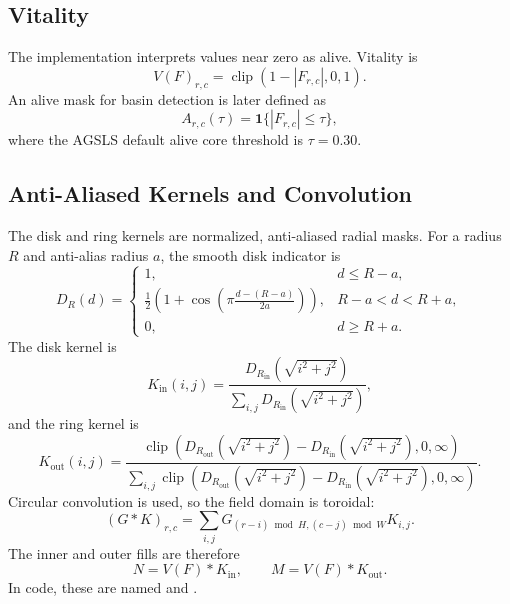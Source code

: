 \documentclass[11pt]{article}
\newcommand{\code}[1]{\texttt{\detokenize{#1}}}
\newcommand{\clip}{\operatorname{clip}}
\begin{document}
\subsection{Vitality}

The implementation interprets values near zero as alive. Vitality is
\begin{equation}
V(F)_{r,c} = \clip(1 - |F_{r,c}|, 0, 1).
\label{eq:vitality}
\end{equation}
An alive mask for basin detection is later defined as
\begin{equation}
A_{r,c}(\tau) = \mathbf{1}\{|F_{r,c}| \le \tau\},
\label{eq:alive-mask}
\end{equation}
where the AGSLS default alive core threshold is $\tau=0.30$.

\subsection{Anti-Aliased Kernels and Convolution}

The disk and ring kernels are normalized, anti-aliased radial masks. For a
radius $R$ and anti-alias radius $a$, the smooth disk indicator is
\begin{equation}
D_R(d) =
\begin{cases}
1, & d \le R-a,\\
\frac{1}{2}\left(1+\cos\left(\pi\frac{d-(R-a)}{2a}\right)\right),
& R-a < d < R+a,\\
0, & d \ge R+a.
\end{cases}
\label{eq:smooth-disk}
\end{equation}
The disk kernel is
\begin{equation}
K_{\mathrm{in}}(i,j)
= \frac{D_{R_{\mathrm{in}}}(\sqrt{i^2+j^2})}
{\sum_{i,j} D_{R_{\mathrm{in}}}(\sqrt{i^2+j^2})},
\label{eq:disk-kernel}
\end{equation}
and the ring kernel is
\begin{equation}
K_{\mathrm{out}}(i,j)
= \frac{\clip(D_{R_{\mathrm{out}}}(\sqrt{i^2+j^2})
-D_{R_{\mathrm{in}}}(\sqrt{i^2+j^2}),0,\infty)}
{\sum_{i,j}\clip(D_{R_{\mathrm{out}}}(\sqrt{i^2+j^2})
-D_{R_{\mathrm{in}}}(\sqrt{i^2+j^2}),0,\infty)}.
\label{eq:ring-kernel}
\end{equation}
Circular convolution is used, so the field domain is toroidal:
\begin{equation}
(G*K)_{r,c} =
\sum_{i,j} G_{(r-i)\bmod H,(c-j)\bmod W}K_{i,j}.
\label{eq:periodic-convolution}
\end{equation}
The inner and outer fills are therefore
\begin{equation}
N = V(F)*K_{\mathrm{in}},
\qquad
M = V(F)*K_{\mathrm{out}}.
\label{eq:inner-outer}
\end{equation}
In code, these are named \code{inner_fill} and \code{outer_fill}.
\end{document}
